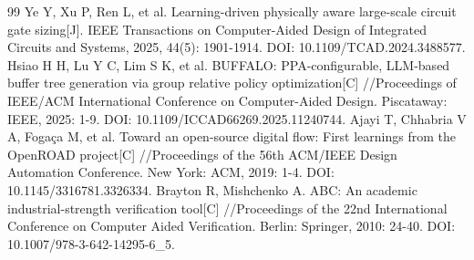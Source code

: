\begin{thebibliography}{99}
 Ye Y, Xu P, Ren L, et al. Learning-driven physically aware large-scale circuit gate sizing[J]. IEEE Transactions on Computer-Aided Design of Integrated Circuits and Systems, 2025, 44(5): 1901-1914. DOI: 10.1109/TCAD.2024.3488577.
 Hsiao H H, Lu Y C, Lim S K, et al. BUFFALO: PPA-configurable, LLM-based buffer tree generation via group relative policy optimization[C] //Proceedings of IEEE/ACM International Conference on Computer-Aided Design. Piscataway: IEEE, 2025: 1-9. DOI: 10.1109/ICCAD66269.2025.11240744.
 Ajayi T, Chhabria V A, Fogaça M, et al. Toward an open-source digital flow: First learnings from the OpenROAD project[C] //Proceedings of the 56th ACM/IEEE Design Automation Conference. New York: ACM, 2019: 1-4. DOI: 10.1145/3316781.3326334.
 Brayton R, Mishchenko A. ABC: An academic industrial-strength verification tool[C] //Proceedings of the 22nd International Conference on Computer Aided Verification. Berlin: Springer, 2010: 24-40. DOI: 10.1007/978-3-642-14295-6\_5.
\end{thebibliography}
